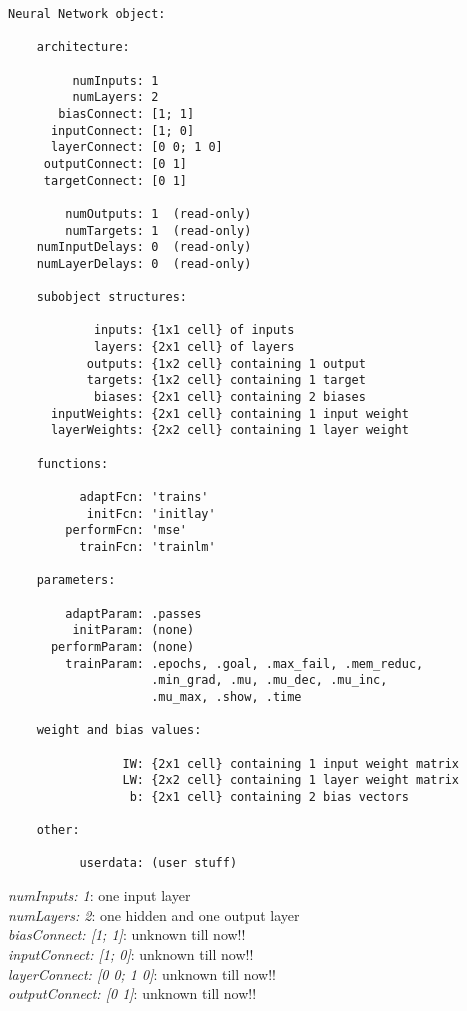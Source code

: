 \begin{verbatim}
Neural Network object:

    architecture:

         numInputs: 1
         numLayers: 2
       biasConnect: [1; 1]
      inputConnect: [1; 0]
      layerConnect: [0 0; 1 0]
     outputConnect: [0 1]
     targetConnect: [0 1]

        numOutputs: 1  (read-only)
        numTargets: 1  (read-only)
    numInputDelays: 0  (read-only)
    numLayerDelays: 0  (read-only)

    subobject structures:

            inputs: {1x1 cell} of inputs
            layers: {2x1 cell} of layers
           outputs: {1x2 cell} containing 1 output
           targets: {1x2 cell} containing 1 target
            biases: {2x1 cell} containing 2 biases
      inputWeights: {2x1 cell} containing 1 input weight
      layerWeights: {2x2 cell} containing 1 layer weight

    functions:

          adaptFcn: 'trains'
           initFcn: 'initlay'
        performFcn: 'mse'
          trainFcn: 'trainlm'

    parameters:

        adaptParam: .passes
         initParam: (none)
      performParam: (none)
        trainParam: .epochs, .goal, .max_fail, .mem_reduc, 
                    .min_grad, .mu, .mu_dec, .mu_inc, 
                    .mu_max, .show, .time

    weight and bias values:

                IW: {2x1 cell} containing 1 input weight matrix
                LW: {2x2 cell} containing 1 layer weight matrix
                 b: {2x1 cell} containing 2 bias vectors

    other:

          userdata: (user stuff)
\end{verbatim}
\textit{numInputs: 1}: one input layer\\
\noindent \textit{numLayers: 2}: one hidden and one output layer\\
\noindent \textit{biasConnect: [1; 1]}: unknown till now!!\\
\noindent \textit{inputConnect: [1; 0]}: unknown till now!!\\
\noindent \textit{layerConnect: [0 0; 1 0]}: unknown till now!!\\
\noindent \textit{outputConnect: [0 1]}: unknown till now!!\\
